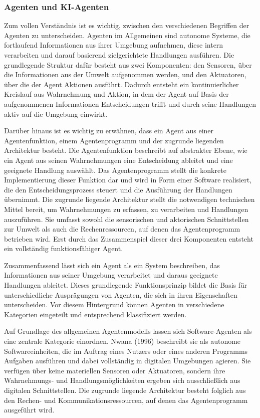 \subsubsection{Agenten und KI-Agenten}
Zum vollen Verständnis ist es wichtig, zwischen den verschiedenen Begriffen der Agenten zu unterscheiden. Agenten im Allgemeinen sind autonome Systeme, die fortlaufend Informationen aus ihrer Umgebung aufnehmen, diese intern verarbeiten und darauf basierend zielgerichtete Handlungen ausführen. Die grundlegende Struktur dafür besteht aus zwei Komponenten: den Sensoren, über die Informationen aus der Umwelt aufgenommen werden, und den Aktuatoren, über die der Agent Aktionen ausführt. Dadurch entsteht ein kontinuierlicher Kreislauf aus Wahrnehmung und Aktion, in dem der Agent auf Basis der aufgenommenen Informationen Entscheidungen trifft und durch seine Handlungen aktiv auf die Umgebung einwirkt. \cite[\pagef 34f]{russell_artificial_2016}

Darüber hinaus ist es wichtig zu erwähnen, dass ein Agent aus einer Agentenfunktion, einem Agentenprogramm und der zugrunde liegenden Architektur besteht. Die Agentenfunktion beschreibt auf abstrakter Ebene, wie ein Agent aus seinen Wahrnehmungen eine Entscheidung ableitet und eine geeignete Handlung auswählt. Das Agentenprogramm stellt die konkrete Implementierung dieser Funktion dar und wird in Form einer Software realisiert, die den Entscheidungsprozess steuert und die Ausführung der Handlungen übernimmt. Die zugrunde liegende Architektur stellt die notwendigen technischen Mittel bereit, um Wahrnehmungen zu erfassen, zu verarbeiten und Handlungen auszuführen. Sie umfasst sowohl die sensorischen und aktorischen Schnittstellen zur Umwelt als auch die Rechenressourcen, auf denen das Agentenprogramm betrieben wird. Erst durch das Zusammenspiel dieser drei Komponenten entsteht ein vollständig funktionsfähiger Agent. \cite[]{russell_artificial_2016}

Zusammenfassend lässt sich ein Agent als ein System beschreiben, das Informationen aus seiner Umgebung verarbeitet und daraus geeignete Handlungen ableitet. Dieses grundlegende Funktionsprinzip bildet die Basis für unterschiedliche Ausprägungen von Agenten, die sich in ihren Eigenschaften unterscheiden. Vor diesem Hintergrund können Agenten in verschiedene Kategorien eingeteilt und entsprechend klassifiziert werden. \cite[]{ertel_grundkurs_2024}

Auf Grundlage des allgemeinen Agentenmodells lassen sich Software-Agenten als eine zentrale Kategorie einordnen. Nwana (1996) beschreibt sie als autonome Softwareeinheiten, die im Auftrag eines Nutzers oder eines anderen Programms Aufgaben ausführen und dabei vollständig in digitalen Umgebungen agieren. Sie verfügen über keine materiellen Sensoren oder Aktuatoren, sondern ihre Wahrnehmungs- und Handlungsmöglichkeiten ergeben sich ausschließlich aus digitalen Schnittstellen. Die zugrunde liegende Architektur besteht folglich aus den Rechen- und Kommunikationsressourcen, auf denen das Agentenprogramm ausgeführt wird. \cite[\pagef 205ff]{nwana_software_1996}

